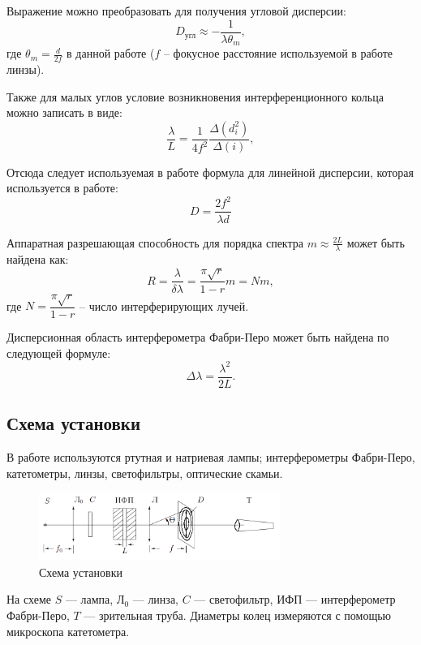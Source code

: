 \documentclass[a4paper,12pt]{article}
\theoremstyle{definition}
\begin{document}
Выражение можно преобразовать для получения угловой дисперсии:
\begin{equation}
    D_{\text{угл}} \approx -\frac{1}{\lambda \theta_{m}},
\end{equation}
где $\theta_{m} = \frac{d}{2f}$ в данной работе ($f$ -- фокусное расстояние используемой в работе линзы).

Также для малых углов условие возникновения  интерференционного кольца можно записать в виде:
\begin{equation}
    \frac{\lambda}{L} = \frac{1}{4f^2}\frac{\Delta(d^2_i)}{\Delta(i)},
\end{equation}

Отсюда следует используемая в работе формула для линейной дисперсии, которая используется в работе:
\begin{equation}
    D = \frac{2f^{2}}{\lambda d}
\end{equation}

Аппаратная разрешающая способность для порядка спектра $m \approx \frac{2L}{\lambda}$ может быть найдена как:
\begin{equation}
    R = \frac{\lambda}{\delta \lambda} = \frac{\pi \sqrt{r}}{1 - r}m = Nm,
\end{equation}
где $N = \dfrac{\pi \sqrt{r}}{1 - r}$ -- число интерферирующих лучей.

Дисперсионная область интерферометра Фабри-Перо может быть найдена по следующей формуле:
\begin{equation}
    \Delta \lambda = \frac{\lambda^{2}}{2L}.
\end{equation}
\subsection*{Схема установки}
В работе используются ртутная и натриевая лампы; интерферометры Фабри-Перо,
катетометры, линзы, светофильтры, оптические скамьи.
\begin{figure}[htbp]
\centerline{\includegraphics[width=0.7\textwidth]{ust.png}}
\caption[]{\label{fig:scheme} Схема установки}
\end{figure}

На схеме $S$ --- лампа, $ Л_0 $ --- линза, $ C $ --- светофильтр, ИФП --- интерферометр
Фабри-Перо, $T$ --- зрительная труба. Диаметры колец измеряются с помощью микроскопа
катетометра.
\end{document}
